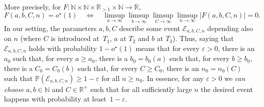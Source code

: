 \documentclass[11pt]{article}
\numberwithin{theorem}{section}
\begin{document}
More precisely, for $F:\mathbb{N}\times \mathbb{N}\times \mathbb{R}_{>1}\times \mathbb{N}\to \mathbb{R}$, 
\[  
    F(a,b,C,n) = o^\star(1)
    \quad\Longleftrightarrow\quad
    \limsup_{a\to\infty} \limsup_{b\to\infty} \limsup_{C\to\infty} \limsup_{n\to \infty} |F(a,b,C,n)| = 0. 
\]
In our setting, the parameters $a,b,C$ describe some event $\mathcal{E}_{a,b,C,n}$ depending also on $n$ (where $C$ is introduced at~$T_1$, $a$ at $T_2$ and $b$ at $T_3$).
Thus, saying that $\mathcal{E}_{a,b,C,n}$ holds with probability $1-o^\star(1)$ means that for every $\varepsilon>0$, there is an $a_0$ such that, for every $a\geq a_0$, there is a $b_0=b_0(a)$ such that, for every $b\geq b_0$, there is a $C_0=C_0(b)$ such that, for every $C\geq C_0$, there is an $n_0=n_0(C)$ such that $\mathbb{P}(\mathcal{E}_{a,b,C,n})\geq 1-\varepsilon$ for all $n\geq n_0$. In essence, for any $\varepsilon > 0$ we \emph{can choose} $a,b\in\mathbb{N}$ and $C\in\mathbb{R}^+$ such that for all sufficiently large $n$ the desired event happens with probability at least~$1-\varepsilon$.
\end{document}
